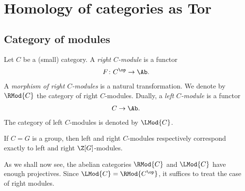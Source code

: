 \section{Homology of categories as Tor}
\subsection{Category of modules}
\begin{definition}
  Let $C$ be a (small) category. A \emph{right $C$\nbd-module} is a
  functor
  \[
    F \colon C^{\op} \to \Ab.
  \]
  A \emph{morphism of right $C$\nbd-modules} is a natural
  transformation. We denote by $\RMod{C}$ the category of right
  $C$\nbd-modules. Dually, a \emph{left $C$\nbd-module} is a functor
  \[
    C \to \Ab.
  \]
  The category of left $C$\nbd-modules is denoted by $\LMod{C}$.
\end{definition}
\begin{example}
  If $C=G$ is a group, then left and right $C$\nbd-modules
  respectively correspond
  exactly to left and right $\Z[G]$\nbd-modules. 
\end{example}

As we shall now see, the abelian categories $\RMod{C}$ and $\LMod{C}$
have enough projectives. Since $\LMod{C}=\RMod{C^{\op}}$, it suffices
to treat the case of right modules.

